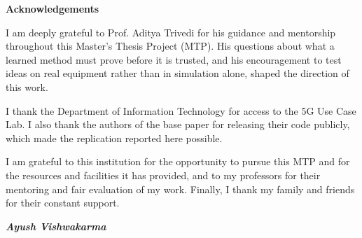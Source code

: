 \begin{center}{\LARGE\bfseries Acknowledgements}\end{center}
\noindent I am deeply grateful to Prof. Aditya Trivedi for his guidance and mentorship throughout this Master's Thesis Project (MTP). His questions about what a learned method must prove before it is trusted, and his encouragement to test ideas on real equipment rather than in simulation alone, shaped the direction of this work.

I thank the Department of Information Technology for access to the 5G Use Case Lab. I also thank the authors of the base paper for releasing their code publicly, which made the replication reported here possible.

I am grateful to this institution for the opportunity to pursue this MTP and for the resources and facilities it has provided, and to my professors for their mentoring and fair evaluation of my work. Finally, I thank my family and friends for their constant support.

\begin{flushright}\textit{\textbf{Ayush Vishwakarma}}\end{flushright}

